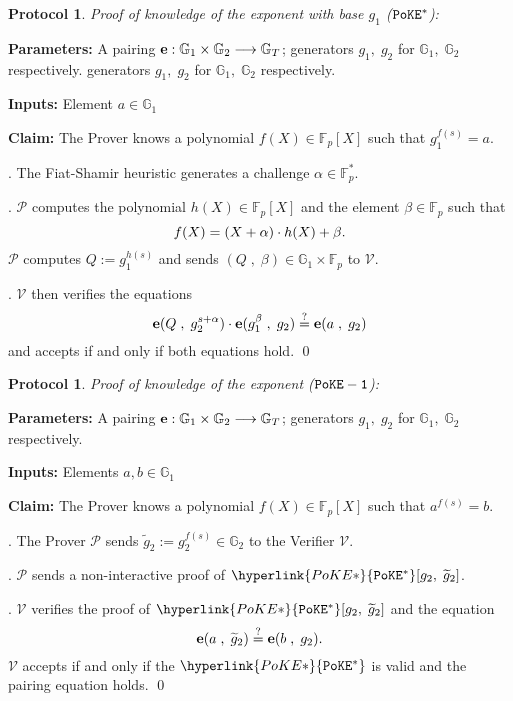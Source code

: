 \documentclass[11pt, lettersize, notitlepage, leqno, footskip=0.6cm]{article}
\newcommand{\bFp}{\mathbb{F}_p}
\newcommand{\bG}{\mathbb{G}}
\newcommand{\lra}{\longrightarrow}
\newcommand{\wti}{\widetilde}
\newcommand{\mc}{\mathcal}
\newcommand{\mb}{\mathbb}
\newcommand{\mbf}{\mathbf}
\newcommand{\al}{\alpha}
\newcommand{\be}{\beta}
\newcommand{\mP}{\mc{P}}
\newcommand{\V}{\mc{V}}
\newcommand{\vs}{\vspace{-0.15cm}}
\newcommand{\noin}{\noindent}
\newcommand{\sta}{\stackrel{?}{=}}
\newcommand{\e}{\mbf{e}}
\newtheorem{Prot}[Thm]{Protocol}
\numberwithin{equation}{section}
\begin{document}
\bigskip


\begin{mdframed}

\begin{Prot} \normalfont \hypertarget{ZKPoKE*}{\textit{Proof of knowledge of the exponent with base $g_1$}} (${\tt{PoKE}}^*$):\end{Prot} 

\noin \textbf{Parameters:} A pairing ${\bf{e}}:\mb{G}_1\times \mb{G}_2\lra \mb{G}_T$; generators $g_1,\;g_2$ for $\mb{G}_1,\; \mb{G}_2$ respectively.
generators $g_1,\;g_2$ for $\mb{G}_1,\; \mb{G}_2$ respectively.

\noin \textbf{Inputs:} Element $a \in \mb{G}_1$

\noin \textbf{Claim:} The Prover knows a polynomial $f(X)\in \bFp[X]$ such that $g_1^{f(s)} = a$.\vspace{1mm}

\noin {}. The Fiat-Shamir heuristic generates a challenge $\al\in \bFp^*$.

\noin 2. $\mP$ computes the polynomial $h(X)\in \bFp[X]$ and the element $\be\in \bFp$ such that \vs $$f(X) = (X+\al)\cdot h(X)+ \be. \vs $$ $\mP$ computes $Q:= g_1^{h(s)}$ and sends $(Q\;,\;\be)\in \mb{G}_1\times \bFp$ to $\V$.

\noin 3. $\V$ then verifies the equations \vspace{-2.5mm} $$\mathbf{e}(Q\;,\; g_2^{s+\al})\cdot \mathbf{e}(g_1^{\be}\;,\; g_2) \sta \mathbf{e}(a\;,\; g_2) \vs $$ and accepts if and only if both equations hold. \qed \end{mdframed}

\bigskip



\begin{mdframed}

\begin{Prot} \normalfont \hypertarget{PoKE}{\textit{Proof of knowledge of the exponent }} (${\tt{PoKE-1}}$):\end{Prot} 

\noin \textbf{Parameters:} A pairing ${\bf{e}}:\mb{G}_1\times \mb{G}_2\lra \mb{G}_T$; generators $g_1,\;g_2$ for $\mb{G}_1,\; \mb{G}_2$ respectively.

\noin \textbf{Inputs:} Elements $a, b\in \mb{G}_1$

\noin \textbf{Claim:} The Prover knows a polynomial $f(X)\in \bFp[X]$ such that $a^{f(s)} = b$.\vspace{1mm}

\noin {}. The Prover $\mP$ sends $\wti{g}_2:= g_2^{f(s)}\in \bG_2$ to the Verifier $\V$.

\noin 2. $\mP$ sends a non-interactive proof of $\hyperlink{PoKE*}{{\tt{PoKE}^*}}[g_2,\;\wti{g}_2]$.

\noin 3. $\V$ verifies the proof of $\hyperlink{PoKE*}{{\tt{PoKE}^*}}[g_2,\;\wti{g}_2]$ and the equation \vs $$\e(a\;,\;\wti{g}_2) \sta \e(b\;,\;g_2). \vs $$ $\V$ accepts if and only if the $\hyperlink{PoKE*}{{\tt{PoKE}^*}}$ is valid and the pairing equation holds. \qed 
\end{mdframed}
\end{document}
